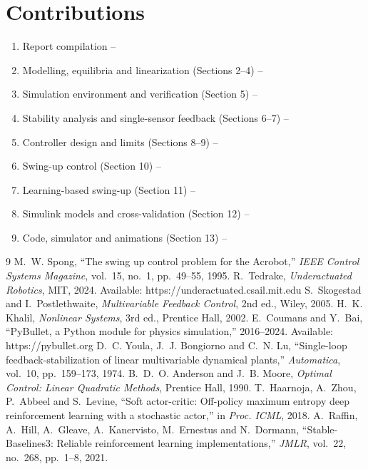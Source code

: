 \documentclass[12pt,a4paper]{article}
\begin{document}
\section{Contributions}
\begin{enumerate}
\item Report compilation -- \underline{\hspace{4cm}}
\item Modelling, equilibria and linearization (Sections 2--4) -- \underline{\hspace{4cm}}
\item Simulation environment and verification (Section 5) -- \underline{\hspace{4cm}}
\item Stability analysis and single-sensor feedback (Sections 6--7) -- \underline{\hspace{4cm}}
\item Controller design and limits (Sections 8--9) -- \underline{\hspace{4cm}}
\item Swing-up control (Section 10) -- \underline{\hspace{4cm}}
\item Learning-based swing-up (Section 11) -- \underline{\hspace{4cm}}
\item Simulink models and cross-validation (Section 12) -- \underline{\hspace{4cm}}
\item Code, simulator and animations (Section 13) -- \underline{\hspace{4cm}}
\end{enumerate}

\begin{thebibliography}{9}
 M.~W. Spong, ``The swing up control problem for the Acrobot,'' \emph{IEEE Control Systems Magazine}, vol.~15, no.~1, pp.~49--55, 1995.
 R.~Tedrake, \emph{Underactuated Robotics}, MIT, 2024. Available: https://underactuated.csail.mit.edu
 S.~Skogestad and I.~Postlethwaite, \emph{Multivariable Feedback Control}, 2nd ed., Wiley, 2005.
 H.~K. Khalil, \emph{Nonlinear Systems}, 3rd ed., Prentice Hall, 2002.
 E.~Coumans and Y.~Bai, ``PyBullet, a Python module for physics simulation,'' 2016--2024. Available: https://pybullet.org
 D.~C. Youla, J.~J. Bongiorno and C.~N. Lu, ``Single-loop feedback-stabilization of linear multivariable dynamical plants,'' \emph{Automatica}, vol.~10, pp.~159--173, 1974.
 B.~D.~O. Anderson and J.~B. Moore, \emph{Optimal Control: Linear Quadratic Methods}, Prentice Hall, 1990.
 T.~Haarnoja, A.~Zhou, P.~Abbeel and S.~Levine, ``Soft actor-critic: Off-policy maximum entropy deep reinforcement learning with a stochastic actor,'' in \emph{Proc. ICML}, 2018.
 A.~Raffin, A.~Hill, A.~Gleave, A.~Kanervisto, M.~Ernestus and N.~Dormann, ``Stable-Baselines3: Reliable reinforcement learning implementations,'' \emph{JMLR}, vol.~22, no.~268, pp.~1--8, 2021.
\end{thebibliography}
\end{document}
